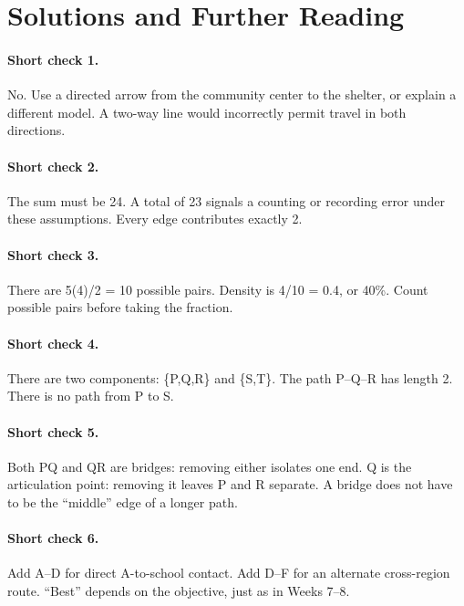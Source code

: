 \documentclass[11pt,letterpaper]{article}
\begin{document}
\clearpage
{\setlength{\parskip}{3pt}\titlespacing*{\paragraph}{0pt}{5pt}{.75em}
\section*{Solutions and Further Reading}

\paragraph{Short check 1.}
No. Use a directed arrow from the community center to the shelter, or explain a different model. A two-way line would incorrectly permit travel in both directions.


\paragraph{Short check 2.}
The sum must be 24. A total of 23 signals a counting or recording error under these assumptions. Every edge contributes exactly 2.


\paragraph{Short check 3.}
There are 5(4)/2 = 10 possible pairs. Density is 4/10 = 0.4, or 40\%. Count possible pairs before taking the fraction.


\paragraph{Short check 4.}
There are two components: \{P,Q,R\} and \{S,T\}. The path P--Q--R has length 2. There is no path from P to S.


\paragraph{Short check 5.}
Both PQ and QR are bridges: removing either isolates one end. Q is the articulation point: removing it leaves P and R separate. A bridge does not have to be the ``middle'' edge of a longer path.


\paragraph{Short check 6.}
Add A--D for direct A-to-school contact. Add D--F for an alternate cross-region route. ``Best'' depends on the objective, just as in Weeks 7--8.


}
\end{document}

